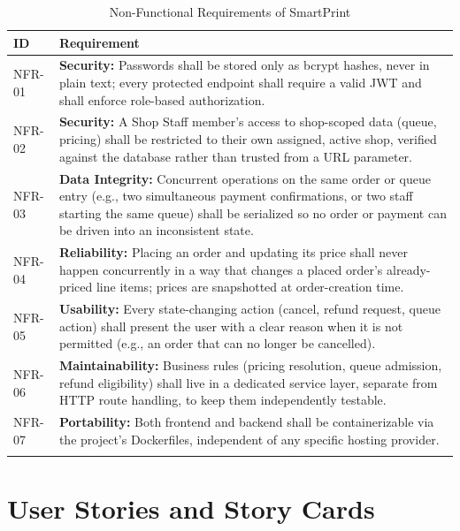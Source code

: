 \documentclass[12pt,a4paper]{report}
\begin{document}
\begin{center}
\renewcommand{\arraystretch}{1.25}
\begin{longtable}{|p{1.6cm}|p{11.7cm}|}
\hline
\textbf{ID} & \textbf{Requirement} \\ \hline
NFR-01 & \textbf{Security:} Passwords shall be stored only as bcrypt hashes, never in plain text; every protected endpoint shall require a valid JWT and shall enforce role-based authorization. \\ \hline
NFR-02 & \textbf{Security:} A Shop Staff member's access to shop-scoped data (queue, pricing) shall be restricted to their own assigned, active shop, verified against the database rather than trusted from a URL parameter. \\ \hline
NFR-03 & \textbf{Data Integrity:} Concurrent operations on the same order or queue entry (e.g., two simultaneous payment confirmations, or two staff starting the same queue) shall be serialized so no order or payment can be driven into an inconsistent state. \\ \hline
NFR-04 & \textbf{Reliability:} Placing an order and updating its price shall never happen concurrently in a way that changes a placed order's already-priced line items; prices are snapshotted at order-creation time. \\ \hline
NFR-05 & \textbf{Usability:} Every state-changing action (cancel, refund request, queue action) shall present the user with a clear reason when it is not permitted (e.g., an order that can no longer be cancelled). \\ \hline
NFR-06 & \textbf{Maintainability:} Business rules (pricing resolution, queue admission, refund eligibility) shall live in a dedicated service layer, separate from HTTP route handling, to keep them independently testable. \\ \hline
NFR-07 & \textbf{Portability:} Both frontend and backend shall be containerizable via the project's Dockerfiles, independent of any specific hosting provider. \\ \hline
\caption{Non-Functional Requirements of SmartPrint}
\end{longtable}
\end{center}

\section{User Stories and Story Cards}
\end{document}
